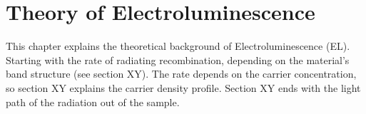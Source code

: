 \chapter{Theory of Electroluminescence}
This chapter explains the theoretical background of Electroluminescence (EL). Starting with the rate of radiating recombination, depending on the material's band structure (see section XY). The rate depends on the carrier concentration, so section XY explains the carrier density profile. Section XY ends with the light path of the radiation out of the sample.